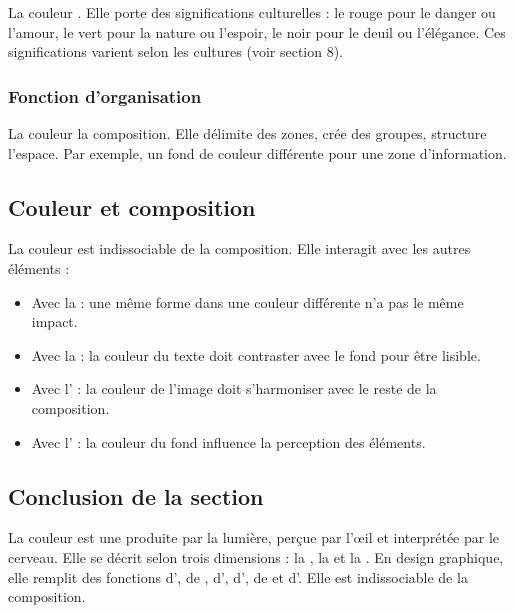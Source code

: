 La couleur . Elle porte des significations culturelles : le rouge pour le danger ou l'amour, le vert pour la nature ou l'espoir, le noir pour le deuil ou l'élégance. Ces significations varient selon les cultures (voir section 8).

\subsubsection{Fonction d'organisation}

La couleur  la composition. Elle délimite des zones, crée des groupes, structure l'espace. Par exemple, un fond de couleur différente pour une zone d'information.

\subsection{Couleur et composition}

La couleur est indissociable de la composition. Elle interagit avec les autres éléments :

\begin{itemize}
    \item Avec la  : une même forme dans une couleur différente n'a pas le même impact.
    \item Avec la  : la couleur du texte doit contraster avec le fond pour être lisible.
    \item Avec l' : la couleur de l'image doit s'harmoniser avec le reste de la composition.
    \item Avec l' : la couleur du fond influence la perception des éléments.
\end{itemize}

\subsection*{Conclusion de la section}

\begin{retenir}
La couleur est une  produite par la lumière, perçue par l'œil et interprétée par le cerveau. Elle se décrit selon trois dimensions : la , la  et la . En design graphique, elle remplit des fonctions d', de , d', d', de  et d'. Elle est indissociable de la composition.
\end{retenir}

